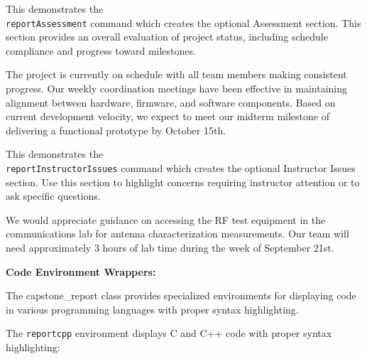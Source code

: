\documentclass[titlecase]{capstone_report}
\begin{document}
\reportAssessment
This demonstrates the \texttt{\\reportAssessment} command which creates the optional Assessment section. This section provides an overall evaluation of project status, including schedule compliance and progress toward milestones.

The project is currently on schedule with all team members making consistent progress. Our weekly coordination meetings have been effective in maintaining alignment between hardware, firmware, and software components. Based on current development velocity, we expect to meet our midterm milestone of delivering a functional prototype by October 15th.

\reportInstructorIssues
This demonstrates the \texttt{\\reportInstructorIssues} command which creates the optional Instructor Issues section. Use this section to highlight concerns requiring instructor attention or to ask specific questions.

We would appreciate guidance on accessing the RF test equipment in the communications lab for antenna characterization measurements. Our team will need approximately 3 hours of lab time during the week of September 21st.

\newpage


\textbf{Code Environment Wrappers:}

The capstone\_report class provides specialized environments for displaying code in various programming languages with proper syntax highlighting.


The \texttt{reportcpp} environment displays C and C++ code with proper syntax highlighting:
\end{document}
